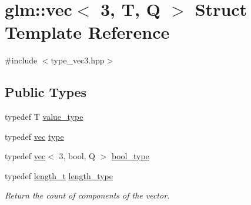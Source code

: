 \hypertarget{structglm_1_1vec_3_013_00_01_t_00_01_q_01_4}{}\section{glm\+:\+:vec$<$ 3, T, Q $>$ Struct Template Reference}
\label{structglm_1_1vec_3_013_00_01_t_00_01_q_01_4}


{\ttfamily \#include $<$type\+\_\+vec3.\+hpp$>$}

\subsection*{Public Types}
\begin{DoxyCompactItemize}
\item 
typedef T \hyperlink{structglm_1_1vec_3_013_00_01_t_00_01_q_01_4_ac9d049f83235863ada16f91e67d28e3f}{value\+\_\+type}
\item 
typedef \hyperlink{structglm_1_1vec}{vec} \hyperlink{structglm_1_1vec_3_013_00_01_t_00_01_q_01_4_aab5e53af2d54d8353fecdd9071c14560}{type}
\item 
typedef \hyperlink{structglm_1_1vec}{vec}$<$ 3, bool, Q $>$ \hyperlink{structglm_1_1vec_3_013_00_01_t_00_01_q_01_4_a8574623d0fe3b330e18c10b8d5022ca6}{bool\+\_\+type}
\item 
typedef \hyperlink{namespaceglm_a090a0de2260835bee80e71a702492ed9}{length\+\_\+t} \hyperlink{structglm_1_1vec_3_013_00_01_t_00_01_q_01_4_ab586a87f82719bfdd180336a98843257}{length\+\_\+type}
\begin{DoxyCompactList}\small\item\em Return the count of components of the vector. \end{DoxyCompactList}\end{DoxyCompactItemize}
